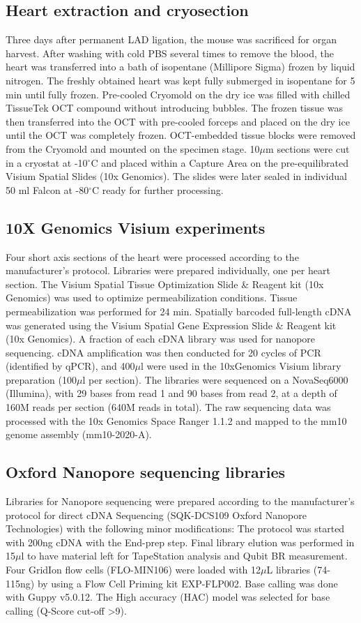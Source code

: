 \documentclass[utf8]{FrontiersinHarvard} %
\begin{document}
\subsection*{Heart extraction and cryosection}
Three days after permanent LAD ligation, the mouse was sacrificed for organ harvest. After washing with cold PBS several times to remove the blood, the heart was transferred into a bath of isopentane (Millipore Sigma) frozen by liquid nitrogen. The freshly obtained heart was kept fully submerged in isopentane for 5 min until fully frozen. Pre-cooled Cryomold on the dry ice was filled with chilled TissueTek OCT compound without introducing bubbles. The frozen tissue was then transferred into the OCT with pre-cooled forceps and placed on the dry ice until the OCT was completely frozen. OCT-embedded tissue blocks were removed from the Cryomold and mounted on the specimen stage. 10$\mu$m sections were cut in a cryostat at -10$^\circ$C and placed within a Capture Area on the pre-equilibrated Visium Spatial Slides (10x Genomics). The slides were later sealed in individual 50 ml Falcon at -80$^\circ$C ready for further processing. 

\subsection*{10X Genomics Visium experiments}
Four short axis sections of the heart were processed according to the manufacturer's protocol. Libraries were prepared individually, one per heart section. The Visium Spatial Tissue Optimization Slide \& Reagent kit (10x Genomics) was used to optimize permeabilization conditions. Tissue permeabilization was performed for 24 min. Spatially barcoded full-length cDNA was generated using the Visium Spatial Gene Expression Slide \& Reagent kit (10x Genomics). A fraction of each cDNA library was used for nanopore sequencing. cDNA amplification was then conducted for 20 cycles of PCR (identified by qPCR), and 400$\mu$l were used in the 10xGenomics Visium library preparation (100$\mu$l per section). The libraries were sequenced on a NovaSeq6000 (Illumina), with 29 bases from read 1 and 90 bases from read 2, at a depth of 160M reads per section (640M reads in total). The raw sequencing data was processed with the 10x Genomics Space Ranger 1.1.2 and mapped to the mm10 genome assembly (mm10-2020-A).

\subsection*{Oxford Nanopore sequencing libraries}
Libraries for Nanopore sequencing were prepared according to the manufacturer's protocol for direct cDNA Sequencing (SQK-DCS109 Oxford Nanopore Technologies) with the following minor modifications: The protocol was started with 200ng cDNA with the End-prep step. Final library elution was performed in 15$\mu$l to have material left for TapeStation analysis and Qubit BR measurement. Four GridIon flow cells (FLO-MIN106) were loaded with 12$\mu$L libraries (74-115ng) by using a Flow Cell Priming kit EXP-FLP002. Base calling was done with Guppy v5.0.12. The High accuracy (HAC) model was selected for base calling (Q-Score cut-off >9).
\end{document}
